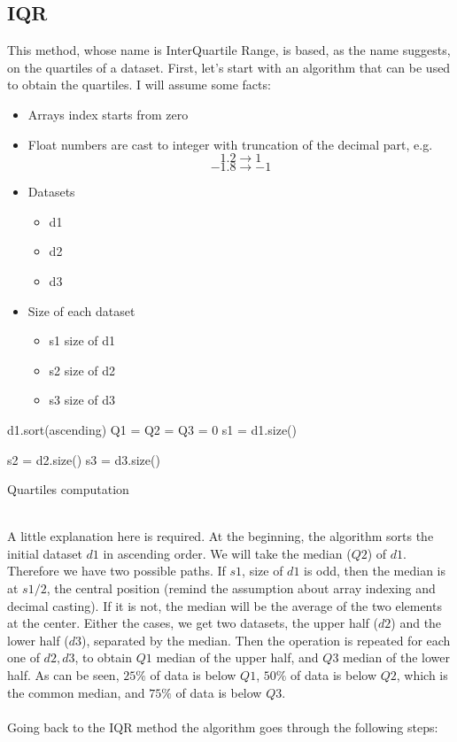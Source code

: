\documentclass[12pt,twoside]{report}
\begin{document}
\subsection{IQR}
This method, whose name is InterQuartile Range, is based, as the name suggests, on the quartiles of a dataset. First, let's start with an algorithm that can be used to obtain the quartiles. I will assume some facts:
\begin{itemize}
    \item Arrays index starts from zero
    \item Float numbers are cast to integer with truncation of the decimal part, e.g.
    $$1.2 \to 1$$
    $$-1.8 \to -1$$
    \item Datasets
    \begin{itemize}
        \item d1
        \item d2
        \item d3
    \end{itemize}
    \item Size of each dataset
    \begin{itemize}
        \item s1
        \subitem size of d1
        \item s2
        \subitem size of d2
        \item s3
        \subitem size of d3
    \end{itemize}
\end{itemize}

\begin{algorithm}[H]
\SetAlgoLined
{}
d1.sort(ascending)\;
Q1 = Q2 = Q3 = 0\;
s1 = d1.size()\;

s2 = d2.size()\;
s3 = d3.size()\;
 \caption{Quartiles computation}
\end{algorithm}
\noindent \\A little explanation here is required. At the beginning, the algorithm sorts the initial dataset $d1$ in ascending order. We will take the median ($Q2$) of $d1$. Therefore we have two possible paths. If $s1$, size of $d1$ is odd, then the median is at $s1/2$, the central position (remind the assumption about array indexing and decimal casting). If it is not, the median will be the average of the two elements at the center. Either the cases, we get two datasets, the upper half ($d2$) and the lower half ($d3$), separated by the median. Then the operation is repeated for each one of $d2,d3$, to obtain $Q1$ median of the upper half, and $Q3$ median of the lower half. As can be seen, $25\%$ of data is below $Q1$, $50\%$ of data is below $Q2$, which is the common median, and $75\%$ of data is below $Q3$. \\\\Going back to the IQR method the algorithm goes through the following steps:
\end{document}
